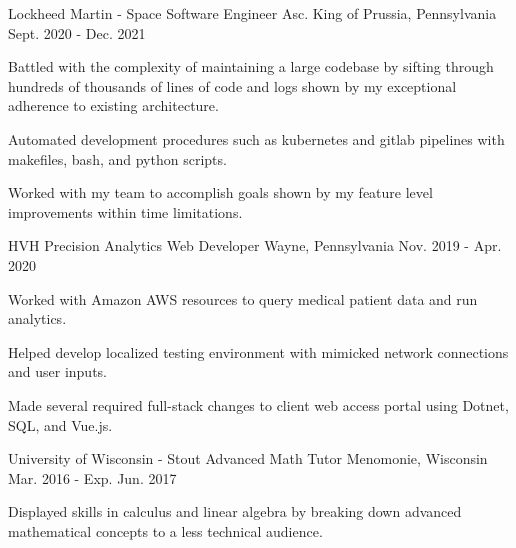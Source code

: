\begin{cventries}
  \cventry
    {Lockheed Martin - Space} %
    {Software Engineer Asc.} %
    {King of Prussia, Pennsylvania} %
    {Sept. 2020 - Dec. 2021} %
    {
      \begin{cvitems} %
        \item {Battled with the complexity of maintaining a large codebase by sifting through hundreds of thousands of lines of code and logs shown by my exceptional adherence to existing architecture.}
        \item {Automated development procedures such as kubernetes and gitlab pipelines with makefiles, bash, and python scripts.}
        \item {Worked with my team to accomplish goals shown by my feature level improvements within time limitations.}
      \end{cvitems}
    }

  \cventry
    {HVH Precision Analytics} %
    {Web Developer} %
    {Wayne, Pennsylvania} %
    {Nov. 2019 - Apr. 2020} %
    {
      \begin{cvitems} %
        \item {Worked with Amazon AWS resources to query medical patient data and run analytics.}
        \item {Helped develop localized testing environment with mimicked network connections and user inputs.}
        \item {Made several required full-stack changes to client web access portal using Dotnet, SQL, and Vue.js.}
      \end{cvitems}
    }

  \cventry
    {University of Wisconsin - Stout} %
    {Advanced Math Tutor} %
    {Menomonie, Wisconsin} %
    {Mar. 2016 - Exp. Jun. 2017} %
    {
      \begin{cvitems} %
        \item {Displayed skills in calculus and linear algebra by breaking down advanced mathematical concepts to a less technical audience.}
      \end{cvitems}
    }


\end{cventries}
